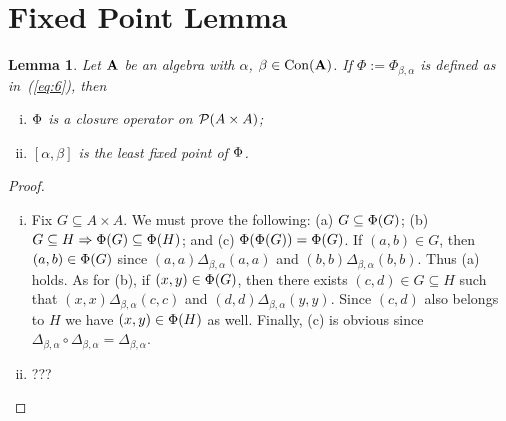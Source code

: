 \documentclass[11pt]{amsart}
\numberwithin{equation}{section}
\theoremstyle{plain}
\newtheorem{lemma}[theorem]{Lemma}
\theoremstyle{definition}
\begin{document}
\section{Fixed Point Lemma}
\begin{lemma} Let $\mathbf{A}$ be an algebra with $\alpha$, $\beta\in \operatorname{Con}(\mathbf{A})$.
  If $\Phi:=\Phi_{\beta, \alpha}$ is defined as in~(\ref{eq:6}), then 
  \begin{enumerate}[(i)]
  \item $\Phi$ is a closure operator on $\mathcal{P}(A\times A)$;
  \item $[\alpha, \beta]$ is the least fixed point of $\Phi$.
  \end{enumerate}
\end{lemma}
\begin{proof}\ 
  \begin{enumerate}[(i)]
  \item Fix $G \subseteq A \times A$. We must prove the following:
    (a) $G \subseteq \Phi(G)$;    
    (b) $G \subseteq H  \Rightarrow \Phi(G) \subseteq \Phi(H)$;    
    and (c) $\Phi(\Phi(G))  = \Phi(G)$.    
    If $(a,b) \in G$, then $(a,b) \in \Phi(G)$ since
    $(a,a) \mathrel{\Delta_{\beta, \alpha}} (a,a)$ and
    $(b,b) \mathrel{\Delta_{\beta, \alpha}} (b,b)$. Thus (a) holds.
    As for (b), if $(x,y) \in \Phi(G)$, then there exists
    $(c,d) \in G \subseteq H$ such that $(x,x) \mathrel{\Delta_{\beta, \alpha}} (c,c)$
    and $(d,d) \mathrel{\Delta_{\beta, \alpha}} (y,y)$. Since
    $(c,d)$ also belongs to $H$ we have $(x,y) \in \Phi(H)$ as well.
    Finally, (c) is obvious since
    $\Delta_{\beta, \alpha} \circ \Delta_{\beta, \alpha} = \Delta_{\beta, \alpha}$.

    \bigskip

  \item ???
    
  \end{enumerate}

  \vfill
  
\end{proof}
\end{document}
